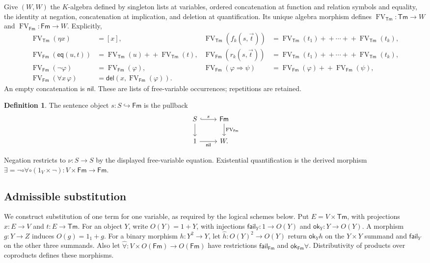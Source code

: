 \documentclass[11pt]{article}
\theoremstyle{definition}\newtheorem{definition}[theorem]{Definition}
\newcommand{\Tm}{\mathsf{Tm}}
\newcommand{\Fm}{\mathsf{Fm}}
\newcommand{\FV}{\operatorname{FV}}
\newcommand{\nil}{\mathsf{nil}}
\newcommand{\del}{\mathsf{del}}
\newcommand{\ok}{\mathsf{ok}}
\newcommand{\fail}{\mathsf{fail}}
\begin{document}
Give $(W,W)$ the $K$-algebra defined by singleton lists at variables,
ordered concatenation at function and relation symbols and equality,
the identity at negation, concatenation at implication, and deletion
at quantification. Its unique algebra morphism defines
$\FV_{\Tm}:\Tm\to W$ and $\FV_{\Fm}:\Fm\to W$. Explicitly,
\begin{align*}
 \FV_{\Tm}(\eta x)&=[x],&
 \FV_{\Tm}(f_k(s,\vec t))&=\FV_{\Tm}(t_1)+\!+\cdots+\!+\FV_{\Tm}(t_k),\\
 \FV_{\Fm}(\mathsf{eq}(u,t))&=\FV_{\Tm}(u)+\!+\FV_{\Tm}(t),&
 \FV_{\Fm}(r_k(s,\vec t))&=\FV_{\Tm}(t_1)+\!+\cdots+\!+\FV_{\Tm}(t_k),\\
 \FV_{\Fm}(\neg\varphi)&=\FV_{\Fm}(\varphi),&
 \FV_{\Fm}(\varphi\Rightarrow\psi)&=\FV_{\Fm}(\varphi)+\!+\FV_{\Fm}(\psi),\\
 \FV_{\Fm}(\forall x\,\varphi)&=\del(x,\FV_{\Fm}(\varphi)).&&
\end{align*}
An empty concatenation is $\nil$. These are lists of free-variable
occurrences; repetitions are retained.

\begin{definition}\label{def:sentence-object}
The sentence object $s:S\hookrightarrow\Fm$ is the pullback
\[
\begin{tikzcd}
 S\arrow[r,hook,"s"]\arrow[d] & \Fm\arrow[d,"\FV_{\Fm}"]\\
 1\arrow[r,"\nil"'] & W.
\end{tikzcd}
\]
\end{definition}
Negation restricts to $\nu:S\to S$ by the displayed free-variable
equation. Existential quantification is the derived morphism
$\exists=\neg\circ\forall\circ(1_V\times\neg):V\times\Fm\to\Fm$.

\subsection{Admissible substitution}
\label{app:substitution}

We construct substitution of one term for one variable, as required
by the logical schemes below. Put $E=V\times\Tm$, with projections
$x:E\to V$ and $t:E\to\Tm$. For an object $Y$, write
$O(Y)=1+Y$, with injections $\fail_Y:1\to O(Y)$ and
$\ok_Y:Y\to O(Y)$. A morphism $g:Y\to Z$ induces
$O(g)=1_1+g$. For a binary morphism $h:Y^2\to Y$, let
$\widehat h:O(Y)^2\to O(Y)$ return $\ok_Yh$ on the
$Y\times Y$ summand and $\fail_Y$ on the other three summands.
Also let $\widehat\forall:V\times O(\Fm)\to O(\Fm)$ have
restrictions $\fail_{\Fm}$ and $\ok_{\Fm}\forall$.
Distributivity of products over coproducts defines these morphisms.
\end{document}
